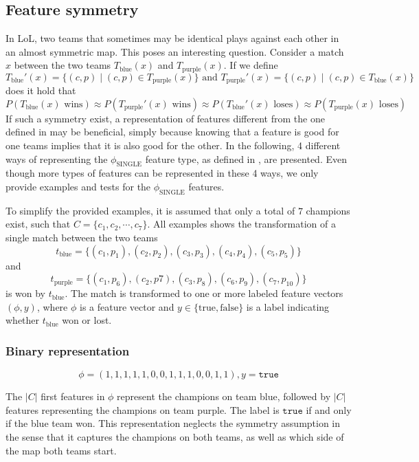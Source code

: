 \subsection{Feature symmetry}
\label{sec:representationoffeatures}
In LoL, two teams that sometimes may be identical plays against each other in an almost symmetric map.
This poses an interesting question.
Consider a match $x$ between the two teams $T_\text{blue}(x)$ and $T_\text{purple}(x)$.
If we define 
\[T_\text{blue}'(x) = \{(c,p) \mid (c,p) \in T_\text{purple}(x)\} \text{ and } T_\text{purple}'(x) = \{(c,p) \mid (c,p) \in T_\text{blue}(x)\}\]
does it hold that 
\[P(T_\text{blue}(x) \text{ wins}) \approx P(T_\text{purple}'(x) \text{ wins}) \approx P(T_\text{blue}'(x) \text{ loses}) \approx P(T_\text{purple}(x) \text{ loses})\]
If such a symmetry exist, a representation of features different from the one defined in  may be beneficial, simply because knowing that a feature is good for one teams implies that it is also good for the other.
In the following, 4 different ways of representing the $\phi_\text{SINGLE}$ feature type, as defined in , are presented.
Even though more types of features can be represented in these 4 ways, we only provide examples and tests for the $\phi_\text{SINGLE}$ features.

To simplify the provided examples, it is assumed that only a total of $7$ champions exist, such that $C = \{c_1, c_2, \cdots, c_7\}$.
All examples shows the transformation of a single match between the two teams \[t_\text{blue} = \{(c_1, p_1), (c_2,p_2), (c_3,p_3), (c_4,p_4), (c_5, p_5)\}\] 
and 
\[t_\text{purple} = \{(c_1, p_6),(c_2,p7), (c_3,p_8),(c_6,p_9),(c_7,p_10)\}\] 
is won by $t_\text{blue}$. The match is transformed to one or more labeled feature vectors $(\phi, y)$, where $\phi$ is a feature vector and $y \in \{\text{true}, \text{false}\}$ is a label indicating whether $t_\text{blue}$ won or lost.

\subsubsection{Binary representation}

\[ \phi = (1,1,1,1,1,0,0,1,1,1,0,0,1,1), y = \texttt{true} \]

The $|C|$ first features in $\phi$ represent the champions on team blue, followed by $|C|$ features representing the champions on team purple. The label is $\texttt{true}$ if and only if the blue team won.
This representation neglects the symmetry assumption in the sense that it captures the champions on both teams, as well as which side of the map both teams start.

